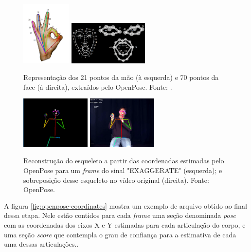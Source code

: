 \begin{figure}[ht]
    \centering
    \includegraphics[width=2.5cm]{images/keypoints_hand}
    \includegraphics[width=4cm]{images/keypoints_face}
    \caption{Representação dos 21 pontos da mão (à esquerda) e 70 pontos da face (à direita), extraídos pelo OpenPose. Fonte: \cite{openpose-output-2018}.}
    \label{fig:keypoints-face-hand}
\end{figure}

\begin{figure}[ht]
    \centering
    \includegraphics[width=3.5cm]{images/sign_pose}
    \includegraphics[width=3.5cm]{images/sign_pose_blended}
    \caption{Reconstrução do esqueleto a partir das coordenadas estimadas pelo OpenPose para um \textit{frame} do sinal "EXAGGERATE" (esquerda); e sobreposição desse esqueleto no vídeo original (direita). Fonte: OpenPose.}
    \label{fig:sign-pose}
\end{figure}

A figura \ref{fig:openpose-coordinates} mostra um exemplo de arquivo obtido ao final dessa etapa. Nele estão contidos para cada \textit{frame} uma seção denominada \textit{pose} com as coordenadas dos eixos X e Y estimadas para cada articulação do corpo, e uma seção \textit{score} que contempla o grau de confiança para a estimativa de cada uma dessas articulações..

